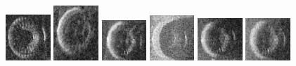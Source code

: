 \begin{figure}
    \includegraphics[width=0.15\textwidth]{chapters/images/dataset/all-class-images/tire/tire-250.jpg}
    \includegraphics[width=0.15\textwidth]{chapters/images/dataset/all-class-images/tire/tire-97.jpg}
    \includegraphics[width=0.15\textwidth]{chapters/images/dataset/all-class-images/tire/tire-159.jpg}
    \includegraphics[width=0.15\textwidth]{chapters/images/dataset/all-class-images/tire/tire-9.jpg}
    \includegraphics[width=0.15\textwidth]{chapters/images/dataset/all-class-images/tire/tire-177.jpg}
    \includegraphics[width=0.15\textwidth]{chapters/images/dataset/all-class-images/tire/tire-125.jpg}
    

\end{figure}
